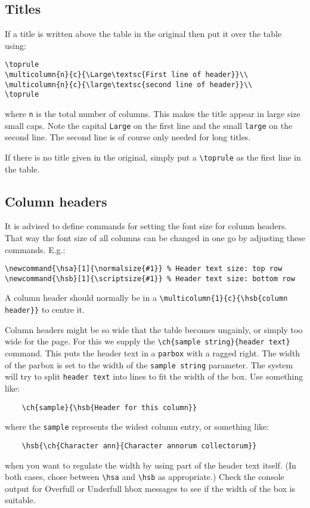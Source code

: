\documentclass{report}
\begin{document}
\subsection{Titles}
If a title is written above the table in the original then put it over the
table using:
\begin{verbatim}
\toprule
\multicolumn{n}{c}{\Large\textsc{First line of header}}\\
\multicolumn{n}{c}{\large\textsc{second line of header}}\\
\toprule
\end{verbatim}
where \verb+n+ is the total number of columns.
This makes the title appear in large size small caps.
Note the capital \verb+Large+
on the first line and the small \verb+large+ on the second line.
The second line is of course only needed for long titles.

If there is no title given in the original, simply put a \verb+\toprule+
as the first line in the table.

\subsection{Column headers}
It is advised to define commands for setting the font size for column headers.
That way the font size of all columns can be changed in one go by adjusting
these commands. E.g.:
\begin{verbatim}
\newcommand{\hsa}[1]{\normalsize{#1}} % Header text size: top row
\newcommand{\hsb}[1]{\scriptsize{#1}} % Header text size: bottom row
\end{verbatim}

A column header should normally be in a
\verb+\multicolumn{1}{c}{\hsb{column header}}+
to centre it.

Column headers might be so wide that the table becomes ungainly, or simply
too wide for the page.
For this we supply the \verb+\ch{sample string}{header text}+ command.
This puts the header text in a \verb+parbox+ with a ragged right.
The width of the parbox is set to the width of the \verb+sample string+
parameter.
The system will try to split \verb+header text+ into lines to fit
the width of the box. Use something like:
\begin{verbatim}
	\ch{sample}{\hsb{Header for this column}}
\end{verbatim}
where the \verb+sample+ represents the widest column entry, or something like:
\begin{verbatim}
	\hsb{\ch{Character ann}{Character annorum collectorum}}
\end{verbatim}
when you want to regulate the width by using part of the header text itself.
(In both cases, chose between \verb+\hsa+ and \verb+\hsb+ as appropriate.)
Check the console output for Overfull or Underfull hbox messages to see
if the width of the box is suitable.
\end{document}
